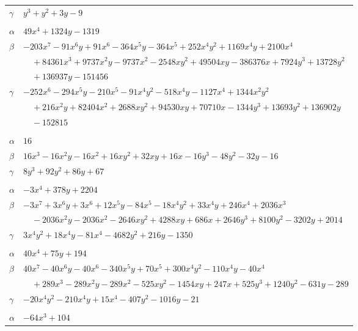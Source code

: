 \documentclass[11pt]{article}
\begin{document}
\begin{longtable}{@{}ll@{}}
$\gamma$ & $y^{3}+y^{2}+3y-9$\\
\addlinespace[3pt]
\multicolumn{2}{@{}l}{$\{i,j\}=\{6,16\}$, $k_{ij}=2^{3}\cdot 5$}\\
$\alpha$ & $49x^{4}+1324y-1319$\\
$\beta$ & $-203x^{7}-91x^{6}y+91x^{6}-364x^{5}y-364x^{5}+252x^{4}y^{2}+1169x^{4}y+2100x^{4}$\\
 & $\quad +84361x^{3}+9737x^{2}y-9737x^{2}-2548xy^{2}+49504xy-386376x+7924y^{3}+13728y^{2}$\\
 & $\quad +136937y-151456$\\
$\gamma$ & $-252x^{6}-294x^{5}y-210x^{5}-91x^{4}y^{2}-518x^{4}y-1127x^{4}+1344x^{2}y^{2}$\\
 & $\quad +216x^{2}y+82404x^{2}+2688xy^{2}+94530xy+70710x-1344y^{3}+13693y^{2}+136902y$\\
 & $\quad -152815$\\
\addlinespace[3pt]
\multicolumn{2}{@{}l}{$\{i,j\}=\{7,8\}$, $k_{ij}=3^{2}\cdot 11$}\\
$\alpha$ & $16$\\
$\beta$ & $16x^{3}-16x^{2}y-16x^{2}+16xy^{2}+32xy+16x-16y^{3}-48y^{2}-32y-16$\\
$\gamma$ & $8y^{3}+92y^{2}+86y+67$\\
\addlinespace[3pt]
\multicolumn{2}{@{}l}{$\{i,j\}=\{7,16\}$, $k_{ij}=2^{2}\cdot 5\cdot 7\cdot 11$}\\
$\alpha$ & $-3x^{4}+378y+2204$\\
$\beta$ & $-3x^{7}+3x^{6}y+3x^{6}+12x^{5}y-84x^{5}-18x^{4}y^{2}+33x^{4}y+246x^{4}+2036x^{3}$\\
 & $\quad -2036x^{2}y-2036x^{2}-2646xy^{2}+4288xy+686x+2646y^{3}+8100y^{2}-3202y+2014$\\
$\gamma$ & $3x^{4}y^{2}+18x^{4}y-81x^{4}-4682y^{2}+216y-1350$\\
\addlinespace[3pt]
\multicolumn{2}{@{}l}{$\{i,j\}=\{7,18\}$, $k_{ij}=2\cdot 3\cdot 7\cdot 11$}\\
$\alpha$ & $40x^{4}+75y+194$\\
$\beta$ & $40x^{7}-40x^{6}y-40x^{6}-340x^{5}y+70x^{5}+300x^{4}y^{2}-110x^{4}y-40x^{4}$\\
 & $\quad +289x^{3}-289x^{2}y-289x^{2}-525xy^{2}-1454xy+247x+525y^{3}+1240y^{2}-631y-289$\\
$\gamma$ & $-20x^{4}y^{2}-210x^{4}y+15x^{4}-407y^{2}-1016y-21$\\
\addlinespace[3pt]
\multicolumn{2}{@{}l}{$\{i,j\}=\{8,10\}$, $k_{ij}=5^{3}$}\\
$\alpha$ & $-64x^{3}+104$\\

\end{longtable}
\end{document}
